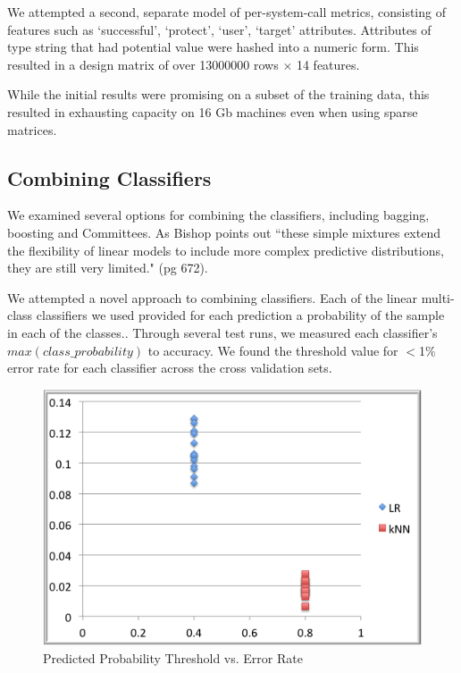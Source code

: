 \documentclass[11pt, oneside]{article}   	%
\begin{document}
We attempted a second, separate model of per-system-call metrics, consisting of features such as `successful', `protect', `user', `target' attributes. Attributes of type string that had potential value were hashed into a numeric form. This resulted in a design matrix of over 13000000 rows $\times$ 14 features.

While the initial results were promising on a subset of the training data, this resulted in exhausting capacity on 16 Gb machines even when using sparse matrices.

\subsection*{Combining Classifiers}

We examined several options for combining the classifiers, including bagging, boosting and Committees. As Bishop points out ``these simple mixtures extend the flexibility of linear models to include more complex predictive distributions, they are still very limited." (pg 672).

We attempted a novel approach to combining classifiers. Each of the linear multi-class classifiers we used provided for each prediction a probability of the sample in each of the classes.\cite{sklearn}. Through several test runs, we measured each classifier's $max(class\_probability)$ to accuracy. We found the threshold value for $<$1\% error rate for each classifier across the cross validation sets. 

\begin{figure}[h!] 
  \centering
  \includegraphics[scale=0.5]{accuracy}
  \caption{Predicted Probability Threshold vs. Error Rate}
\end{figure}
\end{document}
